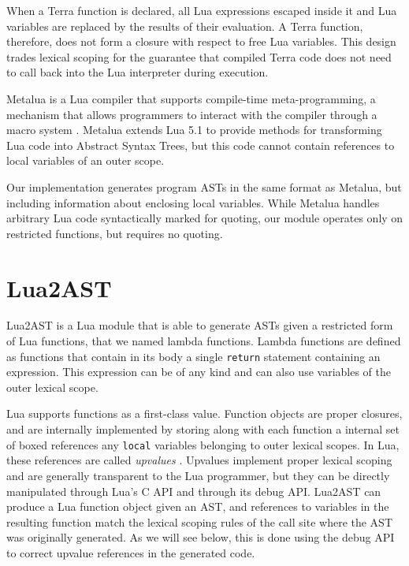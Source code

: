 \documentclass[english]{llncs}
\begin{document}
When a Terra function is declared, all Lua expressions escaped inside it
and Lua variables are replaced by the results of their evaluation.
A Terra function, therefore, does not form a closure with
respect to free Lua variables. This design trades lexical scoping for the
guarantee that compiled Terra code does not need to call back into the Lua
interpreter during execution.

Metalua \cite{metalua} is a Lua compiler that supports compile-time
meta-programming, a mechanism that allows programmers to interact
with the compiler through a macro system \cite{Fleutot2007contrasting}.
Metalua extends Lua 5.1 to provide methods for transforming Lua
code into Abstract Syntax Trees, but this code cannot contain
references to local variables of an outer scope.

Our implementation generates program ASTs in the same format as
Metalua, but including information about enclosing local variables. While Metalua
handles arbitrary Lua code syntactically marked for quoting, our module
operates only on restricted functions, but requires no quoting.

\section{Lua2AST}
\label{sec:lua2ast}

Lua2AST is a Lua module that is able to generate ASTs given a restricted form of Lua functions, that we named lambda functions.
Lambda functions are defined as functions that contain in its body a single \texttt{return} statement containing an expression.
This expression can be of any kind and can also use variables of the outer lexical scope.

Lua supports functions as a first-class value. Function objects are proper closures, and are internally implemented by
storing along with each function a internal set of boxed references any \texttt{local} variables belonging to outer
lexical scopes. In Lua, these references are called \emph{upvalues} \cite{Ierusalimschy2006PIL}.
Upvalues implement proper lexical scoping and are generally transparent to the Lua programmer,
but they can be directly manipulated through Lua's C API and through its debug API.
Lua2AST can produce a Lua function object given an AST, and references to variables
in the resulting function match the lexical scoping rules of the call site where the
AST was originally generated. As we will see below, this is done using the debug API
to correct upvalue references in the generated code.
\end{document}
